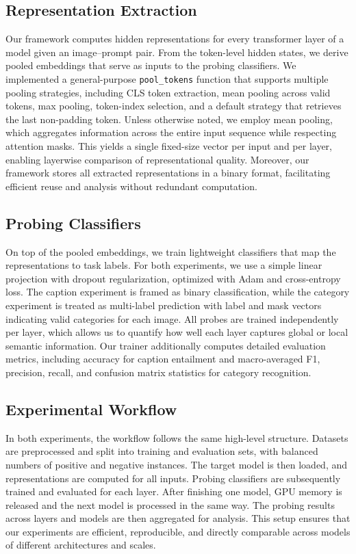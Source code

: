\documentclass[11pt]{article}
\begin{document}
\subsection{Representation Extraction}
Our framework computes hidden representations for every transformer layer of a model
given an image--prompt pair. From the token-level hidden states, we derive pooled embeddings
that serve as inputs to the probing classifiers. We implemented a general-purpose
\texttt{pool\_tokens} function that supports multiple pooling strategies, including
CLS token extraction, mean pooling across valid tokens, max pooling, token-index selection,
and a default strategy that retrieves the last non-padding token. Unless otherwise noted,
we employ mean pooling, which aggregates information across the entire input sequence
while respecting attention masks. This yields a single fixed-size vector per input
and per layer, enabling layerwise comparison of representational quality.
Moreover, our framework stores all extracted representations in a binary format,
facilitating efficient reuse and analysis without redundant computation.


\subsection{Probing Classifiers}
On top of the pooled embeddings, we train lightweight classifiers that map the
representations to task labels. For both experiments, we use a simple linear
projection with dropout regularization, optimized with Adam and cross-entropy loss.
The caption experiment is framed as binary classification, while the category experiment
is treated as multi-label prediction with label and mask vectors indicating valid
categories for each image. All probes are trained independently per layer, which allows
us to quantify how well each layer captures global or local semantic information.
Our trainer additionally computes detailed evaluation metrics, including accuracy for
caption entailment and macro-averaged F1, precision, recall, and confusion matrix
statistics for category recognition.

\subsection{Experimental Workflow}
In both experiments, the workflow follows the same high-level structure.
Datasets are preprocessed and split into training and evaluation sets, with
balanced numbers of positive and negative instances. The target model is then
loaded, and representations are computed for all inputs. Probing classifiers are subsequently trained
and evaluated for each layer. After finishing one model, GPU memory is released
and the next model is processed in the same way. The probing results across
layers and models are then aggregated for analysis. This setup ensures that
our experiments are efficient, reproducible, and directly comparable across
models of different architectures and scales.
\end{document}

